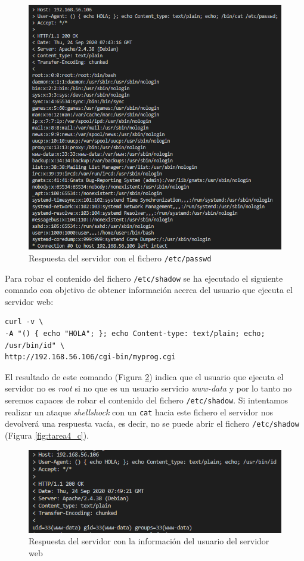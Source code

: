 \documentclass[10pt,a4paper]{article}
\begin{document}
\begin{figure}[h!]
\centering
\includegraphics[scale=0.7]{images/Tarea_4a.png}
\caption{Respuesta del servidor con el fichero \texttt{/etc/passwd}}
\label{fig:tarea4_a} 
\end{figure}

Para robar el contenido del fichero \texttt{/etc/shadow} se ha ejecutado el siguiente comando con objetivo de obtener información acerca del usuario que ejecuta el servidor web:

\begin{lstlisting}
curl -v \
-A "() { echo "HOLA"; }; echo Content-type: text/plain; echo; /usr/bin/id" \
http://192.168.56.106/cgi-bin/myprog.cgi
\end{lstlisting}

El resultado de este comando (Figura \ref{fig:tarea4_b}) indica que el usuario que ejecuta el servidor no es \emph{root} si no que es un usuario servicio \emph{www-data} y por lo tanto no seremos capaces de robar el contenido del fichero \texttt{/etc/shadow}. Si intentamos realizar un ataque \emph{shellshock} con un \texttt{cat} hacia este fichero el servidor nos devolverá una respuesta vacía, es decir, no se puede abrir el fichero \texttt{/etc/shadow} (Figura \ref{fig:tarea4_c}).

\begin{figure}[h!]
\centering
\includegraphics[scale=0.7]{images/Tarea_4b.png}
\caption{Respuesta del servidor con la información del usuario del servidor web}
\label{fig:tarea4_b} 
\end{figure}
\end{document}
